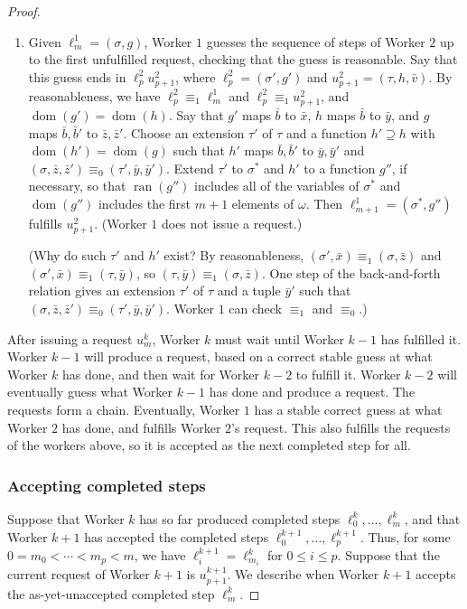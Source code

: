 \documentclass{article}
\DeclareMathOperator{\dom}{dom}
\DeclareMathOperator{\ran}{ran}
\theoremstyle{definition}
\begin{document}
\begin{proof}
\begin{enumerate}
			\item Given $\ell^1_m = (\sigma,g)$, Worker $1$ guesses the sequence of steps of Worker $2$ up to the first unfulfilled request, checking that the guess is reasonable. Say that this guess ends in $\ell^2_p u^2_{p+1}$, where $\ell^2_p = (\sigma',g')$ and $u^2_{p+1} = (\tau,h,\bar{v})$. By reasonableness, we have $\ell^2_p\equiv_1\ell^1_m$ and $\ell^2_p\equiv_1 u^2_{p+1}$, and $\dom(g')=\dom(h)$. Say that $g'$ maps $\bar{b}$ to $\bar{x}$, $h$ maps $\bar{b}$ to $\bar{y}$, and $g$ maps $\bar{b},\bar{b}'$ to $\bar{z},\bar{z}'$. Choose an extension $\tau'$ of $\tau$ and a function $h'\supseteq h$ with $\dom(h')=\dom(g)$ such that $h'$ maps $\bar{b},\bar{b}'$ to $\bar{y},\bar{y}'$ and $(\sigma,\bar{z},\bar{z}')\equiv_0(\tau',\bar{y},\bar{y}')$. Extend $\tau'$ to $\sigma^*$ and $h'$ to a function $g''$, if necessary, so that $\ran(g'')$ includes all of the variables of $\sigma^*$ and $\dom(g'')$ includes the first $m+1$ elements of $\omega$. Then $\ell^1_{m+1}=(\sigma^*,g'')$ fulfills $u^2_{p+1}$. (Worker $1$ does not issue a request.) \par (Why do such $\tau'$ and $h'$ exist? By reasonableness, $(\sigma',\bar{x})\equiv_1(\sigma,\bar{z})$ and $(\sigma',\bar{x})\equiv_1(\tau,\bar{y})$, so $(\tau,\bar{y})\equiv_1(\sigma,\bar{z})$. One step of the back-and-forth relation gives an extension $\tau'$ of $\tau$ and a tuple $\bar{y}'$ such that $(\sigma,\bar{z},\bar{z}')\equiv_0(\tau',\bar{y},\bar{y}')$. Worker $1$ can check $\equiv_1$ and $\equiv_0$.)
			
		\end{enumerate}
		
		After issuing a request $u^k_m$, Worker $k$ must wait until Worker $k-1$ has fulfilled it. Worker $k-1$ will produce a request, based on a correct stable guess at what Worker $k$ has done, and then wait for Worker $k-2$ to fulfill it. Worker $k-2$ will eventually guess what Worker $k-1$ has done and produce a request. The requests form a chain. Eventually, Worker $1$ has a stable correct guess at what Worker $2$ has done, and fulfills Worker $2$'s request. This also fulfills the requests of the workers above, so it is accepted as the next completed step for all. 
		

			\subsubsection{Accepting completed steps}
			
			Suppose that Worker $k$ has so far produced completed steps
			$\ell^k_0,\ldots,\ell^k_m$, and that Worker $k+1$ has accepted the
			completed steps $\ell^{k+1}_0,\ldots,\ell^{k+1}_p$. Thus, for some
			$0=m_0<\cdots<m_p<m$, we have
			$\ell^{k+1}_i=\ell^k_{m_i}$ for $0\leq i\leq p$. Suppose that the
			current request of Worker $k+1$ is $u^{k+1}_{p+1}$. We describe when
			Worker $k+1$ accepts the as-yet-unaccepted completed step
			$\ell^k_m$.
			

\end{proof}
\end{document}
